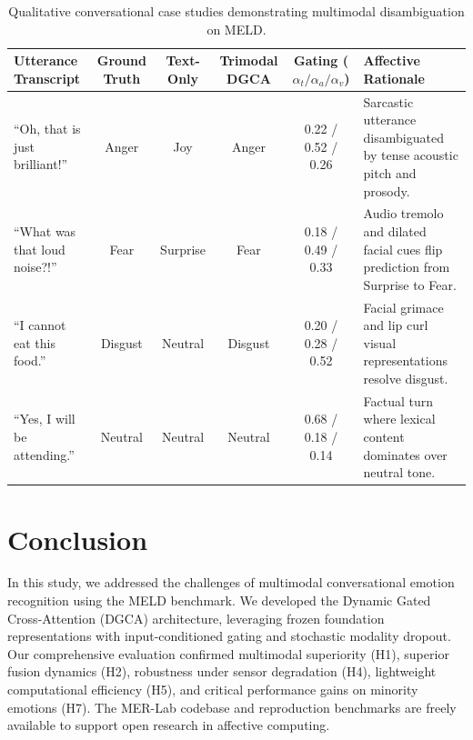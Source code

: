 \documentclass[10pt,twocolumn,letterpaper]{article}
\begin{document}
\begin{table}[t]
\centering
\small
\caption{Qualitative conversational case studies demonstrating multimodal disambiguation on MELD.}
\label{tab:case_studies}
\begin{tabular}{p{5.2cm}ccccp{4.2cm}}
\toprule
\textbf{Utterance Transcript} & \textbf{Ground Truth} & \textbf{Text-Only} & \textbf{Trimodal DGCA} & \textbf{Gating ($\alpha_t/\alpha_a/\alpha_v$)} & \textbf{Affective Rationale} \\
\midrule
``Oh, that is just brilliant!'' & Anger & Joy & Anger & 0.22 / 0.52 / 0.26 & Sarcastic utterance disambiguated by tense acoustic pitch and prosody. \\
``What was that loud noise?!'' & Fear & Surprise & Fear & 0.18 / 0.49 / 0.33 & Audio tremolo and dilated facial cues flip prediction from Surprise to Fear. \\
``I cannot eat this food.'' & Disgust & Neutral & Disgust & 0.20 / 0.28 / 0.52 & Facial grimace and lip curl visual representations resolve disgust. \\
``Yes, I will be attending.'' & Neutral & Neutral & Neutral & 0.68 / 0.18 / 0.14 & Factual turn where lexical content dominates over neutral tone. \\
\bottomrule
\end{tabular}
\end{table}

\section{Conclusion}
\label{sec:conclusion}
In this study, we addressed the challenges of multimodal conversational emotion recognition using the MELD benchmark. We developed the Dynamic Gated Cross-Attention (DGCA) architecture, leveraging frozen foundation representations with input-conditioned gating and stochastic modality dropout. Our comprehensive evaluation confirmed multimodal superiority (H1), superior fusion dynamics (H2), robustness under sensor degradation (H4), lightweight computational efficiency (H5), and critical performance gains on minority emotions (H7). The MER-Lab codebase and reproduction benchmarks are freely available to support open research in affective computing.
\end{document}

